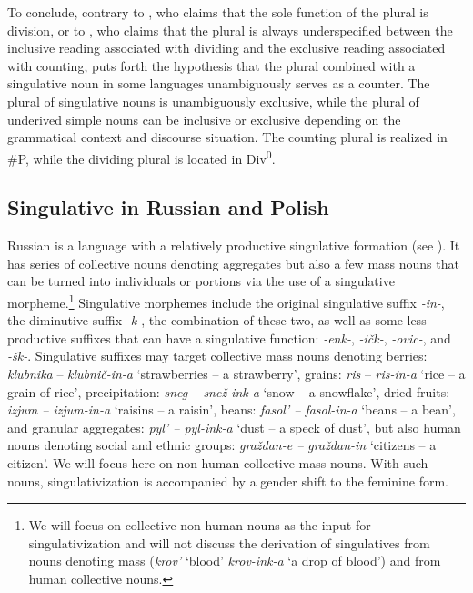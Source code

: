 \documentclass[output=paper,colorlinks,citecolor=brown]{langscibook}
\begin{document}
To conclude, contrary to \citet{Borer2005}, who claims that the sole function of the plural is division, or to \citet{Alexiadou2019}, who claims that the plural is always underspecified between the inclusive reading associated with dividing and the exclusive reading associated with counting, \citet{Mathieu2014} puts forth the hypothesis that the plural combined with a singulative noun in some languages unambiguously serves as a counter. The plural of singulative nouns is unambiguously exclusive, while the plural of underived simple nouns can be inclusive or exclusive depending on the grammatical context and discourse situation. The counting plural is realized in \#P, while the dividing plural is located in Div\textsuperscript{0}. 


\subsection{Singulative in Russian and Polish}\label{sec:geist:3.2}

Russian is a language with a relatively productive singulative formation (see \citealt{GeistInprep}). It has series of collective nouns denoting aggregates but also a few mass nouns that can be turned into individuals or portions via the use of a singulative morpheme.\footnote{We will focus on collective non-human nouns as the input for singulativization and will not discuss the derivation of singulatives from nouns denoting mass (\textit{krov'} `blood' \textit{krov-ink-a} `a drop of blood') and from human collective nouns.} Singulative morphemes include the original singulative suffix \textit{-in-}, the diminutive suffix \textit{-k-}, the combination of these two, as well as some less productive suffixes that can have a singulative function: \textit{-enk-}, \textit{-ičk-}, \textit{-ovic-}, and \textit{-šk-}. Singulative suffixes may target collective mass nouns denoting berries: \textit{klubnika} -- \textit{klubnič-in-a} `strawberries -- a strawberry', grains: \textit{ris} -- \textit{ris-in-a} `rice -- a grain of rice', precipitation: \textit{sneg -- snež-ink-a} `snow -- a snowflake', dried fruits: \textit{izjum -- izjum-in-a} `raisins -- a raisin', beans: \textit{fasol' -- fasol-in-a} `beans -- a bean', and granular aggregates: \textit{pyl' -- pyl-ink-a} `dust -- a speck of dust', but also human nouns denoting social and ethnic groups: \textit{graždan-e -- graždan-in} `citizens --  a citizen'. We will focus here on non-human collective mass nouns. With such nouns, singulativization is accompanied by a gender shift to the feminine form.  
\end{document}

